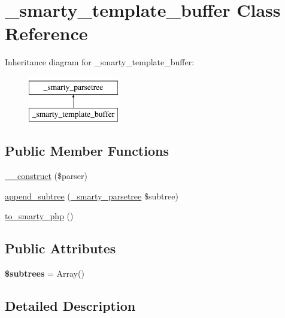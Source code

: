 \hypertarget{class__smarty__template__buffer}{\section{\-\_\-smarty\-\_\-template\-\_\-buffer Class Reference}
\label{class__smarty__template__buffer}
}
Inheritance diagram for \-\_\-smarty\-\_\-template\-\_\-buffer\-:\begin{figure}[H]
\begin{center}
\leavevmode
\includegraphics[height=2.000000cm]{class__smarty__template__buffer}
\end{center}
\end{figure}
\subsection*{Public Member Functions}
\begin{DoxyCompactItemize}
\item 
\hyperlink{class__smarty__template__buffer_a4d20f3239c10a53d37ed351cc61d010e}{\-\_\-\-\_\-construct} (\$parser)
\item 
\hyperlink{class__smarty__template__buffer_aa610c249e3071d71e93466b4e9eec651}{append\-\_\-subtree} (\hyperlink{class__smarty__parsetree}{\-\_\-smarty\-\_\-parsetree} \$subtree)
\item 
\hyperlink{class__smarty__template__buffer_a4fe8feaa70df2606b6ac071d3225a239}{to\-\_\-smarty\-\_\-php} ()
\end{DoxyCompactItemize}
\subsection*{Public Attributes}
\begin{DoxyCompactItemize}
\item 
\hypertarget{class__smarty__template__buffer_a02bf4f86a85d3dea4ecd198ae6ee62c1}{{\bfseries \$subtrees} = Array()}\label{class__smarty__template__buffer_a02bf4f86a85d3dea4ecd198ae6ee62c1}

\end{DoxyCompactItemize}


\subsection{Detailed Description}


